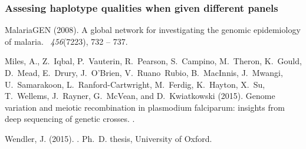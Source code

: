 \subsubsection{Assesing haplotype qualities when given different panels}







\begin{thebibliography}{}

MalariaGEN (2008).
\newblock A global network for investigating the genomic epidemiology of
  malaria.
~{\em 456\/}(7223), 732 -- 737.

Miles, A., Z.~Iqbal, P.~Vauterin, R.~Pearson, S.~Campino, M.~Theron, K.~Gould,
  D.~Mead, E.~Drury, J.~O{\textquoteright}Brien, V.~Ruano~Rubio, B.~MacInnis,
  J.~Mwangi, U.~Samarakoon, L.~Ranford-Cartwright, M.~Ferdig, K.~Hayton, X.~Su,
  T.~Wellems, J.~Rayner, G.~McVean, and D.~Kwiatkowski (2015).
\newblock Genome variation and meiotic recombination in plasmodium falciparum:
  insights from deep sequencing of genetic crosses.
.

Wendler, J. (2015).
.
\newblock Ph.\ D. thesis, University of Oxford.

\end{thebibliography}
